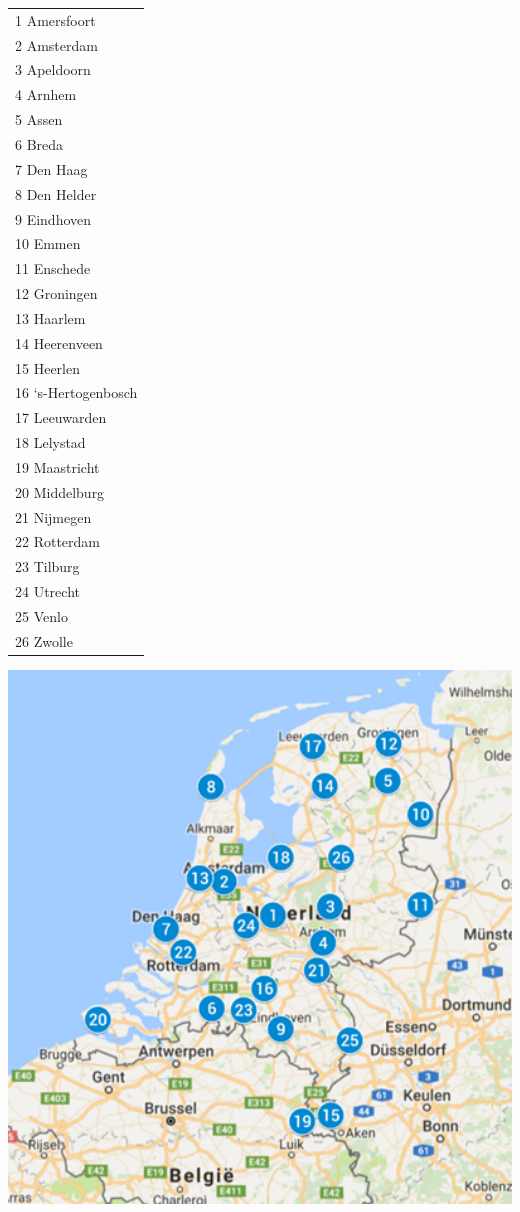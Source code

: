\begin{table} [t]
\parbox{0.4\textwidth}{

	\begin{tabular}{l}
		1 Amersfoort\\ 
		2 Amsterdam\\
		3 Apeldoorn\\
		4 Arnhem\\
		5 Assen\\
		6 Breda\\
		7 Den Haag\\
		8 Den Helder\\
		9 Eindhoven\\
		10 Emmen\\
		11 Enschede\\
		12 Groningen\\
		13 Haarlem\\
		14 Heerenveen\\
		15 Heerlen\\
		16 ‘s-Hertogenbosch\\
		17 Leeuwarden\\
		18 Lelystad\\
		19 Maastricht\\
		20 Middelburg\\
		21 Nijmegen\\
		22 Rotterdam\\
		23 Tilburg\\
		24 Utrecht\\
		25 Venlo\\
		26 Zwolle
	\end{tabular}
	\label{26cities}
}
\qquad
	\begin{minipage}[c]{0.6\textwidth} 
		\centering
			\includegraphics[width=1.2\textwidth, center]{26cities}
		\label{map1}
	\end{minipage}
\end{table}

